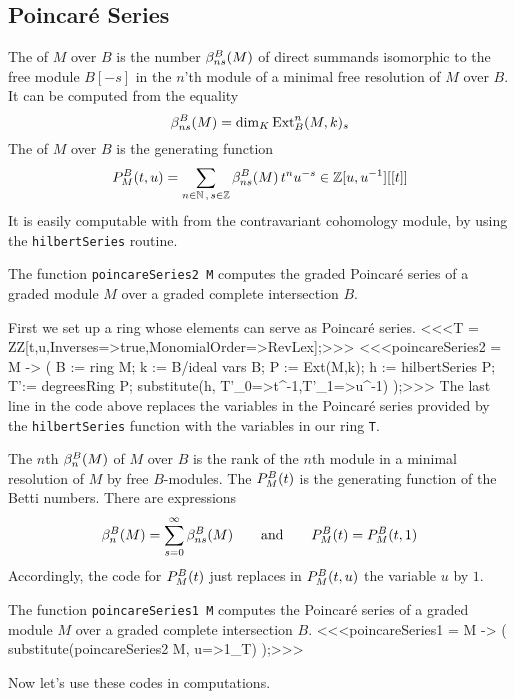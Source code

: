 \subsection{Poincar\'e Series}
\label{Poincare series}

The {\it{}\/} of $M$ over $B$ is the number
$\beta_{ns}^B(M)$ of direct summands isomorphic to the free module
$B[-s]$ in the $n$'th module of a minimal free resolution of $M$ over
$B$.  It can be computed from the equality
\[
\beta_{ns}^B(M)=\dim_K\operatorname{Ext}^n_B(M,k)_{s}
\]
The {\it{}\/} of $M$ over $B$ is the
generating function
\[
{P}^B_M(t,u)=\sum_{n\in{\mathbb N}\,,\,s\in{\mathbb Z}}\beta_{ns}^B(M)\, t^n u^{-s}
\in{\mathbb Z}[u,u^{-1}][[t]]
\]
It is easily computable with \Mtwo from the contravariant cohomology
module, by using the {\tt hilbertSeries} routine.

\begin{sCode}
The function {\tt poincareSeries2 M} computes the graded Poin\-car\'e
series of a graded module $M$ over a graded complete intersection $B$.

First we set up a ring whose elements can serve as Poincar\'e series.
<<<T = ZZ[t,u,Inverses=>true,MonomialOrder=>RevLex];>>>
<<<poincareSeries2 = M -> (
   B := ring M;
   k := B/ideal vars B;
   P := Ext(M,k);
   h := hilbertSeries P;
   T':= degreesRing P;
   substitute(h, {T'_0=>t^-1,T'_1=>u^-1})
   );>>>
The last line in the code above replaces the variables in the
Poincar\'e series provided by the {\tt hilbertSeries} function with the
variables in our ring {\tt T}.
 \end{sCode}

The $n$th {\it{}\/} $\beta^B_n(M)$ of $M$ over $B$ is the
rank of the $n$th module in a minimal resolution of $M$ by free
$B$-modules.  The {\it{}\/} ${P}^B_M(t)$ is the
generating function of the Betti numbers.  There are expressions
\[
\beta^B_n(M)=\sum_{s=0}^\infty\beta^B_{ns}(M)
\qquad\text{and}\qquad
{P}^B_M(t)={P}^B_M(t,1)
\]
Accordingly, the code for ${P}^B_M(t)$ just replaces
in ${P}^B_M(t,u)$ the variable $u$ by $1$.

\begin{sCode}
The function {\tt poincareSeries1 M} computes the Poincar\'e series of a
graded module $M$ over a graded complete intersection $B$.
<<<poincareSeries1 = M -> (
   substitute(poincareSeries2 M, {u=>1_T})
   );>>>
\end{sCode}

Now let's use these codes in computations.

